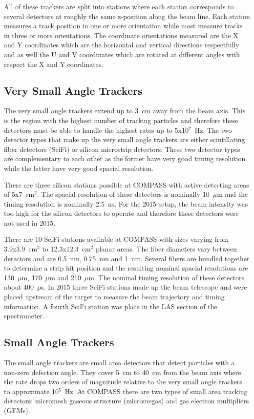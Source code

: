 All of these trackers are split into stations where each station corresponds to
several detectors at roughly the same z-position along the beam line.  Each
station measures a track position in one or more orientation while most measure
tracks in three or more orientations.  The coordinate orientations measured are
the X and Y coordinates which are the horizontal and vertical directions
respectfully and as well the U and V coordinates which are rotated at different
angles with respect the X and Y coordinates. \par

\subsection{Very Small Angle Trackers}
The very small angle trackers extend up to 3~cm away from the beam axis.  This
is the region with the highest number of tracking particles and therefore these
detectors must be able to handle the highest rates up to 5x10$^7$~Hz.  The two
detector types that make up the very small angle trackers are either
scintillating fiber detectors (SciFi) or silicon microstrip detectors.  These
two detector types are complementary to each other as the former have very good
timing resolution while the latter have very good spacial resolution. \par

There are three silicon stations possible at COMPASS with active detecting areas
of 5x7~cm$^2$.  The spacial resolution of these detectors is nominally 10~$\mu$m
and the timing resolution is nominally 2.5~ns.  For the 2015 setup, the beam
intensity was too high for the silicon detectors to operate and therefore these
detectors were not used in 2015. \par

There are 10 SciFi stations available at COMPASS with sizes varying from
3.9x3.9~cm$^2$ to 12.3x12.3~cm$^2$ planar areas.  The fiber diameters vary
between detectors and are 0.5~nm, 0.75~nm and 1~nm.  Several fibers are bundled
together to determine a strip hit position and the resulting nominal spacial
resolutions are 130~$\mu$m, 170~$\mu$m and 210~$\mu$m.  The nominal timing
resolution of these detectors about 400~ps.  In 2015 three SciFi stations made
up the beam telescope and were placed upstream of the target to measure the beam
trajectory and timing information.  A fourth SciFi station was place in the LAS
section of the spectrometer. \par

\subsection{Small Angle Trackers}
The small angle trackers are small area detectors that detect particles with a
non-zero defection angle.  They cover 5~cm to 40~cm from the beam axis where the
rate drops two orders of magnitude relative to the very small angle trackers to
approximate 10$^5$~Hz.  At COMPASS there are two types of small area tracking
detectors: micromesh gaseous structure (micromegas) and gas electron multipliers
(GEMs). \par

